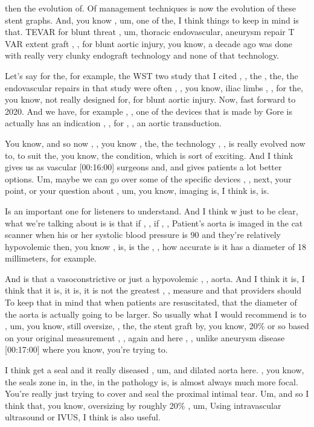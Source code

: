 \documentclass[
]{book}
\begin{document}
then the evolution of. Of management techniques is now the evolution of
these stent graphs. And, you know , um, one of the, I think things to
keep in mind is that. TEVAR for blunt threat , um, thoracic
endovascular, aneurysm repair T VAR extent graft , , for blunt aortic
injury, you know, a decade ago was done with really very clunky
endograft technology and none of that technology.

Let's say for the, for example, the WST two study that I cited , , the ,
the, the endovascular repairs in that study were often , , you know,
iliac limbs , , for the, you know, not really designed for, for blunt
aortic injury. Now, fast forward to 2020. And we have, for example , ,
one of the devices that is made by Gore is actually has an indication ,
, for , , an aortic transduction.

You know, and so now , , you know , the, the technology , , is really
evolved now to, to suit the, you know, the condition, which is sort of
exciting. And I think gives us as vascular {[}00:16:00{]} surgeons and, and
gives patients a lot better options. Um, maybe we can go over some of
the specific devices , , next, your point, or your question about , um,
you know, imaging is, I think is, is.

Is an important one for listeners to understand. And I think w just to
be clear, what we're talking about is is that if , , if , , Patient's
aorta is imaged in the cat scanner when his or her systolic blood
pressure is 90 and they're relatively hypovolemic then, you know , is,
is the , , how accurate is it has a diameter of 18 millimeters, for
example.

And is that a vasoconstrictive or just a hypovolemic , , aorta. And I
think it is, I think that it is, it is, it is not the greatest , ,
measure and that providers should To keep that in mind that when
patients are resuscitated, that the diameter of the aorta is actually
going to be larger. So usually what I would recommend is to , um, you
know, still oversize, , the, the stent graft by, you know, 20\% or so
based on your original measurement , , again and here , , unlike
aneurysm disease {[}00:17:00{]} where you know, you're trying to.

I think get a seal and it really diseased , um, and dilated aorta here.
, you know, the seals zone in, in the, in the pathology is, is almost
always much more focal. You're really just trying to cover and seal the
proximal intimal tear. Um, and so I think that, you know, oversizing by
roughly 20\% , um, Using intravascular ultrasound or IVUS, I think is
also useful.
\end{document}
